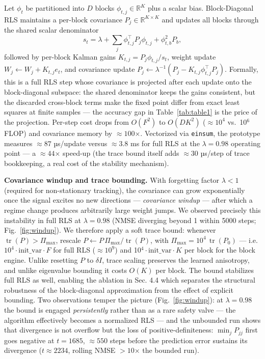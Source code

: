 \documentclass[11pt]{article}
\begin{document}
Let \(\phi_t\) be partitioned into \(D\) blocks \(\phi_{t,j} \in
\mathbb{R}^{K}\) plus a scalar bias. Block-Diagonal RLS maintains a
per-block covariance \(P_j \in \mathbb{R}^{K\times K}\) and updates all
blocks through the shared scalar denominator
\[
s_t = \lambda + \sum_{j}\phi_{t,j}^{\top} P_{j}\phi_{t,j} + \phi_{t,b}^{2}P_{b},
\]
followed by per-block Kalman gains \(K_{t,j} = P_{j}\phi_{t,j}/s_t\),
weight update \(W_j \!\leftarrow\! W_j + K_{t,j}e_t\), and covariance
update \(P_j \leftarrow \lambda^{-1}(P_j - K_{t,j}
\phi_{t,j}^{\top}P_{j})\). Formally, this is a full RLS step whose
covariance is projected after each update onto the block-diagonal
subspace: the shared denominator keeps the gains consistent, but the
discarded cross-block terms make the fixed point differ from exact
least squares at finite samples --- the accuracy gap in Table~\ref{tab:table1} is the
price of the projection. Per-step cost drops from \(O(F^{2})\) to
\(O(D K^{2})\) (\(\approx\)\(10^{4}\) vs.~10\(^{6}\) FLOP) and covariance
memory by \(\approx 100\)×. Vectorized via
\texttt{einsum}, the prototype measures \(\approx 87\) µs/update versus
\(\approx 3.8\) ms for full RLS at the \(\lambda{=}0.98\) operating point
--- a \(\approx 44\)× speed-up (the trace bound itself adds
\(\approx 30\) µs/step of trace bookkeeping, a real cost of the
stability mechanism).

\textbf{Covariance windup and trace bounding.} With forgetting factor
\(\lambda<1\) (required for non-stationary tracking), the covariance can
grow exponentially once the signal excites no new directions ---
\emph{covariance windup} --- after which a regime change produces arbitrarily
large weight jumps. We observed precisely this instability in full RLS
at \(\lambda=0.98\) (NMSE diverging beyond 1 within 5000 steps; Fig.~\ref{fig:windup}).
We therefore apply a soft trace bound: whenever
\(\operatorname{tr}(P) > \Pi_{\max}\), rescale \(P \leftarrow
P\,\Pi_{\max}/\operatorname{tr}(P)\), with
\(\Pi_{\max}=10^{4}\,\operatorname{tr}(P_{0})\) --- i.e.
\(10^{4}\!\cdot\!\mathrm{init\_var}\!\cdot\!F\) for full RLS
(\(\approx\!10^{9}\)) and 10\(^{4}\!\cdot\!\mathrm{init\_var}\!\cdot\!K\)
per block for the block engine. Unlike resetting \(P\) to
\(\delta I\), trace scaling preserves the learned anisotropy, and unlike
eigenvalue bounding it costs \(O(K)\) per block. The bound stabilizes
full RLS as well, enabling the ablation in Sec. 4.4 which separates
the structural robustness of the block-diagonal approximation from the
effect of explicit bounding. Two observations temper the picture
(Fig.~\ref{fig:windup}): at \(\lambda{=}0.98\) the bound is engaged
\emph{persistently} rather than as a rare safety valve --- the algorithm
effectively becomes a normalized RLS --- and the unbounded run shows
that divergence is not overflow but the loss of positive-definiteness:
\(\min_j P_{jj}\) first goes negative at \(t{=}1685\), \(\approx 550\) steps
before the prediction error sustains its divergence (\(t{\approx}2234\),
rolling NMSE \(> 10\)× the bounded run).
\end{document}

